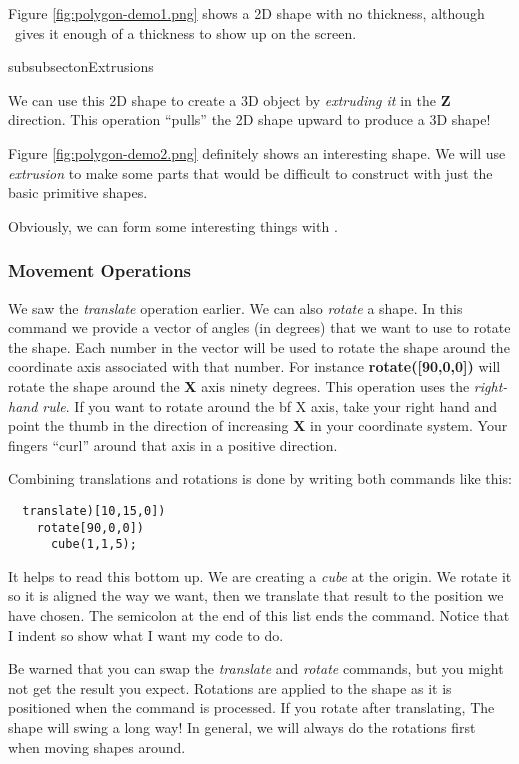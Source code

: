 Figure \ref{fig:polygon-demo1.png} shows a  2D shape with no thickness, although
\osc\ gives it enough of a thickness to show up on the screen.

subsubsecton{Extrusions}

We can use this 2D shape to create a 3D object by {\it extruding it} in the
{\bf Z} direction. This operation ``pulls'' the 2D shape upward to produce a 3D
shape!


Figure \ref{fig:polygon-demo2.png} definitely shows an interesting shape. We
will use {\it extrusion} to make some parts that would be difficult to construct
with just the basic primitive shapes.


Obviously, we can form some interesting things with \osc.

\subsubsection{Movement Operations}

We saw the {\it translate} operation earlier. We can also {\it rotate} a shape.
In this command we provide a vector of angles (in degrees) that we want to use
to rotate the shape. Each number in the vector will be used to rotate the shape
around the coordinate axis associated with that number. For instance {\bf
rotate([90,0,0])} will rotate the shape around the {\bf X} axis ninety degrees.
This operation uses the {\it right-hand rule}. If you want to rotate around the
{bf X} axis, take your right hand and point the thumb in the direction of
increasing {\bf X} in your coordinate system. Your fingers ``curl'' around that
axis in a positive direction.

Combining translations and rotations is done by writing both commands like
this:

\begin{lstlisting}
  translate)[10,15,0])
    rotate[90,0,0])
      cube(1,1,5);
\end{lstlisting}

It helps to read this bottom up. We are creating a {\it cube} at the origin. We
rotate it so it is aligned the way we want, then we translate that result to
the position we have chosen. The semicolon at the end of this list ends the
command. Notice that I indent so show what I want my code to do.

Be warned that you can swap the {\it translate} and {\it rotate} commands, but
you might not get the result you expect. Rotations are applied to the shape as
it is positioned when the command is processed. If you rotate after
translating, The shape will swing a long way! In general, we will always do the
rotations first when moving shapes around.

